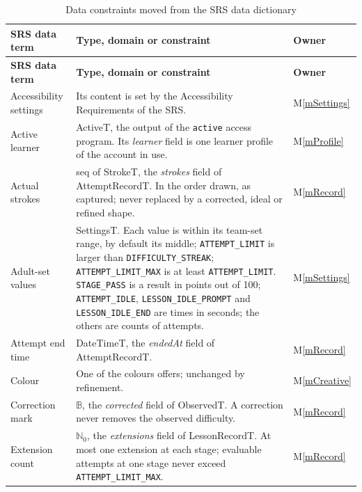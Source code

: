 \documentclass[12pt, titlepage]{article}
\newcommand{\mref}[1]{M\ref{#1}}
\begin{document}
{\small
\renewcommand{\arraystretch}{1.2}
\begin{longtable}{@{}>{\raggedright\arraybackslash}p{}
>{\raggedright\arraybackslash}p{}
>{\raggedright\arraybackslash}p{}@{}}
\caption{Data constraints moved from the SRS data dictionary}\label{tab:srs-data-constraints}\\
\toprule
\textbf{SRS data term} & \textbf{Type, domain or constraint} & \textbf{Owner}\\
\midrule
\endfirsthead
\toprule
\textbf{SRS data term} & \textbf{Type, domain or constraint} & \textbf{Owner}\\
\midrule
\endhead
\bottomrule
\endlastfoot
Accessibility settings & Its content is set by the Accessibility Requirements of the SRS. & \mref{mSettings}\\
Active learner & ActiveT, the output of the \texttt{active} access program. Its \emph{learner} field is one learner profile of the account in use. & \mref{mProfile}\\
Actual strokes & seq of StrokeT, the \emph{strokes} field of AttemptRecordT. In the order drawn, as captured; never replaced by a corrected, ideal or refined shape. & \mref{mRecord}\\
Adult-set values & SettingsT. Each value is within its team-set range, by default its middle; \texttt{ATTEMPT\_\allowbreak LIMIT} is larger than \texttt{DIFFICULTY\_\allowbreak STREAK}; \texttt{ATTEMPT\_\allowbreak LIMIT\_\allowbreak MAX} is at least \texttt{ATTEMPT\_\allowbreak LIMIT}. \texttt{STAGE\_\allowbreak PASS} is a result in points out of 100; \texttt{ATTEMPT\_\allowbreak IDLE}, \texttt{LESSON\_\allowbreak IDLE\_\allowbreak PROMPT} and \texttt{LESSON\_\allowbreak IDLE\_\allowbreak END} are times in seconds; the others are counts of attempts. & \mref{mSettings}\\
Attempt end time & DateTimeT, the \emph{endedAt} field of AttemptRecordT. & \mref{mRecord}\\
Colour & One of the colours \progname{} offers; unchanged by refinement. & \mref{mCreative}\\
Correction mark & $\mathbb{B}$, the \emph{corrected} field of ObservedT. A correction never removes the observed difficulty. & \mref{mRecord}\\
Extension count & $\mathbb{N}_0$, the \emph{extensions} field of LessonRecordT. At most one extension at each stage; evaluable attempts at one stage never exceed \texttt{ATTEMPT\_\allowbreak LIMIT\_\allowbreak MAX}. & \mref{mRecord}\\

\end{longtable}}
\end{document}
